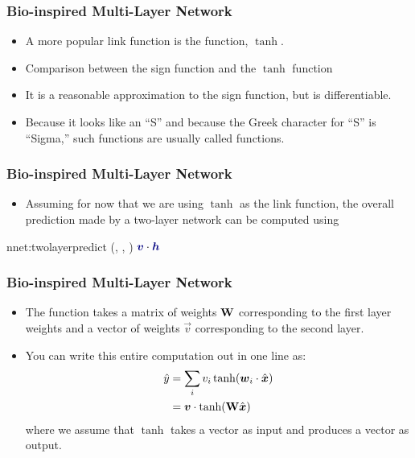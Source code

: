 \documentclass[trans]{beamer}
\begin{document}
\begin{frame}
  \frametitle{Bio-inspired Multi-Layer Network}
\begin{itemize}
\item
A more popular link function is the 
function, $\tanh$. 
\item Comparison between the sign function and the
$\tanh$ function 
\item It
is a reasonable approximation to the sign function, but 
is differentiable.%
\item  Because it looks like an ``S'' and because the
Greek character for ``S'' is ``Sigma,'' such functions are usually
called  functions.
\end{itemize}
\end{frame}

\begin{frame}
  \frametitle{Bio-inspired Multi-Layer Network}
\begin{itemize}
\item
Assuming for now that we are using $\tanh$ as the link function, the
overall prediction made by a two-layer network can be computed using
\end{itemize}
\newalgorithm%
  {nnet:twolayerpredict}%
  {(, , \VAR{$\hat\vx$})}
  {
\ENDFOR
\RETURN $\dotp{\VARm{\vec v}}{\VARm{\vec h}}$
}
\end{frame}

\begin{frame}
  \frametitle{Bio-inspired Multi-Layer Network}
\begin{itemize}
\item The function takes a
matrix of weights $\text{\bf W}$ corresponding to the first layer weights
and a vector of weights $\vec v$ corresponding to the second layer.
\item
You can write this entire computation out in one line as:
%
\begin{align}
\hat y
&= \sum_i v_i \tanh( \boldsymbol{w}_i \cdot \hat{{\boldsymbol{x}}} ) \\
&= \boldsymbol{v} \cdot \tanh( \text{\bf W} \hat{{\boldsymbol{x}}} ) \label{eq:nnet:matrixeq}
\end{align}
%
where we assume that $\tanh$ takes a
vector as input and produces a vector as output.
\end{itemize}
\end{frame}
\end{document}

